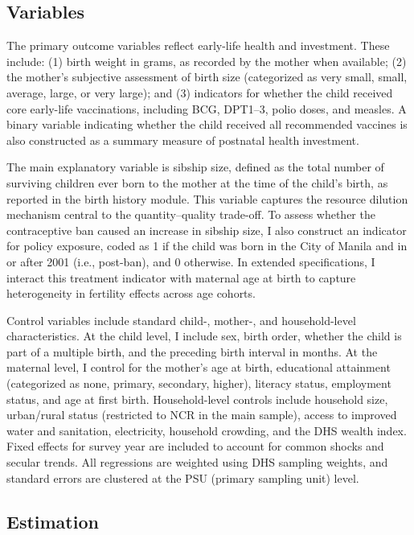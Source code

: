 \documentclass[]{AEA}
\begin{document}
\subsection{Variables}

The primary outcome variables reflect early-life health and investment.
These include: (1) birth weight in grams, as recorded by the mother when
available; (2) the mother's subjective assessment of birth size
(categorized as very small, small, average, large, or very large); and
(3) indicators for whether the child received core early-life
vaccinations, including BCG, DPT1--3, polio doses, and measles. A binary
variable indicating whether the child received all recommended vaccines
is also constructed as a summary measure of postnatal health investment.

The main explanatory variable is sibship size, defined as the total
number of surviving children ever born to the mother at the time of the
child's birth, as reported in the birth history module. This variable
captures the resource dilution mechanism central to the
quantity--quality trade-off. To assess whether the contraceptive ban
caused an increase in sibship size, I also construct an indicator for
policy exposure, coded as 1 if the child was born in the City of Manila
and in or after 2001 (i.e., post-ban), and 0 otherwise. In extended
specifications, I interact this treatment indicator with maternal age at
birth to capture heterogeneity in fertility effects across age cohorts.

Control variables include standard child-, mother-, and household-level
characteristics. At the child level, I include sex, birth order, whether
the child is part of a multiple birth, and the preceding birth interval
in months. At the maternal level, I control for the mother's age at
birth, educational attainment (categorized as none, primary, secondary,
higher), literacy status, employment status, and age at first birth.
Household-level controls include household size, urban/rural status
(restricted to NCR in the main sample), access to improved water and
sanitation, electricity, household crowding, and the DHS wealth index.
Fixed effects for survey year are included to account for common shocks
and secular trends. All regressions are weighted using DHS sampling
weights, and standard errors are clustered at the PSU (primary sampling
unit) level.

\subsection{Estimation}
\end{document}
